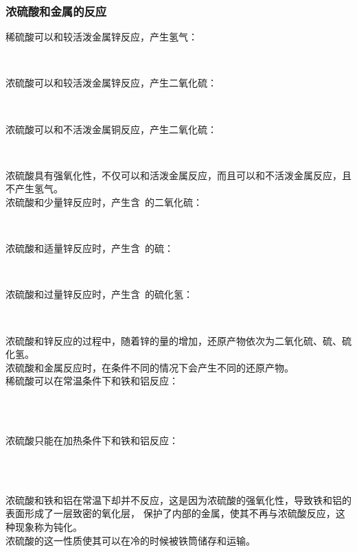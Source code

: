 \documentclass[UTF8]{ctexart}
\newcommand{\LiValence}[3]
{
    \overset{\texttt{\tiny #1}\text{\tiny #2}}{\ce{#3}}
}
\begin{document}
\subsubsection{浓硫酸和金属的反应}
    稀硫酸可以和较活泼金属锌反应，产生氢气：
    \begin{center}
        \\[4mm]
    \end{center}
    浓硫酸可以和较活泼金属锌反应，产生二氧化硫：
    \begin{center}
        \\[4mm]
    \end{center}
    浓硫酸可以和不活泼金属铜反应，产生二氧化硫：
    \begin{center}
        \\[4mm]
    \end{center}
    浓硫酸具有强氧化性，不仅可以和活泼金属反应，而且可以和不活泼金属反应，且不产生氢气。\\[8mm]
    浓硫酸和少量锌反应时，产生含~\ce{$\LiValence{+}{4}{S}$}的二氧化硫：
    \begin{center}
        \\[4mm]
    \end{center}
    浓硫酸和适量锌反应时，产生含~\ce{$\LiValence{}{0}{S}$}的硫：
    \begin{center}
        \\[4mm]
    \end{center}
    浓硫酸和过量锌反应时，产生含~\ce{$\LiValence{-}{2}{S}$}的硫化氢：
    \begin{center}
        \\[4mm]
    \end{center}
    浓硫酸和锌反应的过程中，随着锌的量的增加，还原产物依次为二氧化硫、硫、硫化氢。\\[3mm]
    浓硫酸和金属反应时，在条件不同的情况下会产生不同的还原产物。\\[8mm]
    稀硫酸可以在常温条件下和铁和铝反应：
    \begin{center}
        \\[2mm]
        \\[4mm]
    \end{center}
    浓硫酸只能在加热条件下和铁和铝反应：
    \begin{center}
        \\[2mm]
        \\[4mm]
    \end{center}
    浓硫酸和铁和铝在常温下却并不反应，这是因为浓硫酸的强氧化性，导致铁和铝的表面形成了一层致密的氧化层，
    保护了内部的金属，使其不再与浓硫酸反应，这种现象称为钝化。\\[3mm]
    浓硫酸的这一性质使其可以在冷的时候被铁筒储存和运输。
\end{document}
